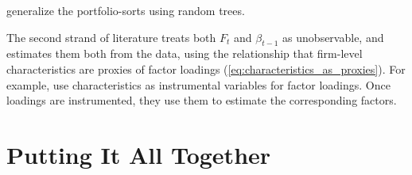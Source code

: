 		\cite{bryzgalova2019forest} generalize the portfolio-sorts using random trees.     
		
		The second strand of literature treats both $F_t$ and $\beta_{t-1}$ as unobservable, and estimates them both from the data, using the  relationship that firm-level characteristics are proxies of factor loadings (\ref{eq:characteristics_as_proxies}). For example, \cite{kelly2019characteristics} use characteristics as instrumental variables for factor loadings. Once loadings are instrumented, they use them to estimate the corresponding factors.
	
		\cite{gu2020empirical} 
    
	\section{Putting It All Together}
	

	
	   
	
	   
	




